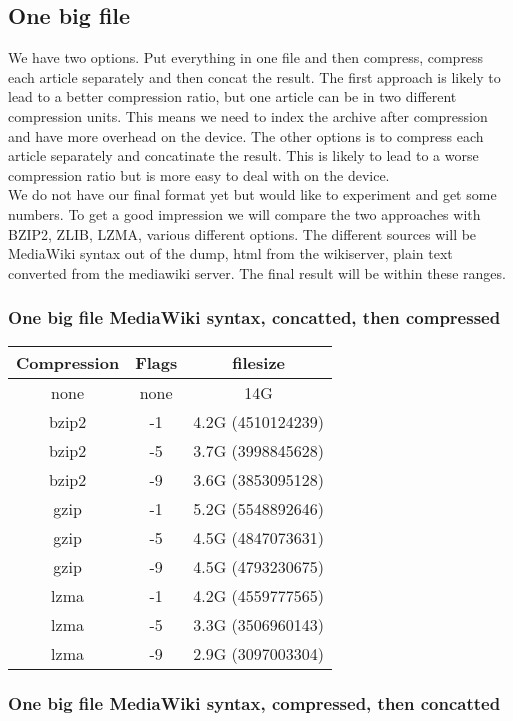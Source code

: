 \documentclass{article}
\begin{document}
\subsection{One big file}
We have two options. Put everything in one file and then compress, compress each article separately and then concat the result. The first approach is likely to lead to a better compression ratio, but one article can be in two different compression units. This means we need to index the archive after compression and have more overhead on the device. The other options is to compress each article separately and concatinate the result. This is likely to lead to a worse compression ratio but is more easy to deal with on the device.\\
We do not have our final format yet but would like to experiment and get some numbers. To get a good impression we will compare the two approaches with BZIP2, ZLIB, LZMA, various different options. The different sources will be MediaWiki syntax out of the dump, html from the wikiserver, plain text converted from the mediawiki server. The final result will be within these ranges.

\subsubsection{One big file MediaWiki syntax, concatted, then compressed}
\begin{tabular}{|c|c|c|}
\hline
Compression & Flags & filesize \\ \hline
none & none & 14G \\ \hline
bzip2 & -1 & 4.2G (4510124239) \\ \hline
bzip2 & -5 & 3.7G (3998845628) \\ \hline
bzip2 & -9 & 3.6G (3853095128) \\ \hline
gzip  & -1 & 5.2G (5548892646) \\ \hline
gzip  & -5 & 4.5G (4847073631) \\ \hline
gzip  & -9 & 4.5G (4793230675) \\ \hline
lzma  & -1 & 4.2G (4559777565) \\ \hline
lzma  & -5 & 3.3G (3506960143) \\ \hline
lzma  & -9 & 2.9G (3097003304) \\ \hline
\end{tabular}

\subsubsection{One big file MediaWiki syntax, compressed, then concatted}
\end{document}
